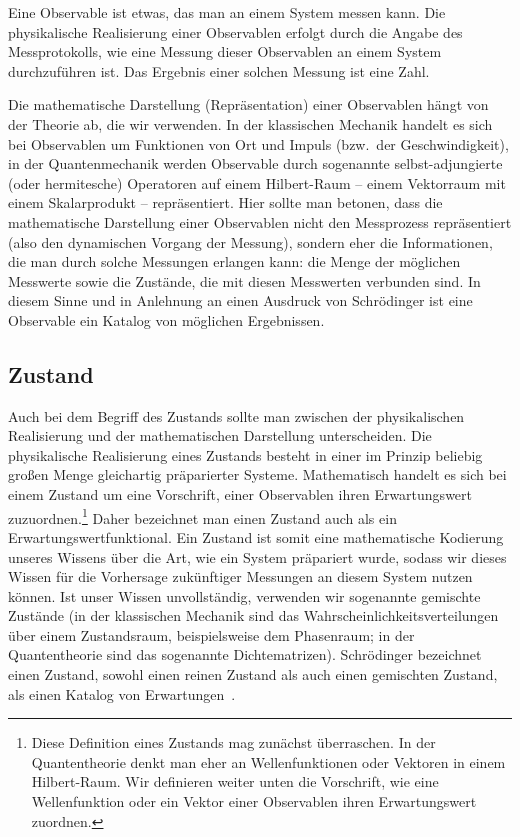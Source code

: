 Eine Observable ist etwas, das man an einem System messen kann. 
Die physikalische Realisierung einer Observablen erfolgt durch die Angabe des Messprotokolls, wie
eine Messung dieser Observablen an einem System durchzuf\"uhren ist. Das Ergebnis einer solchen
Messung ist eine Zahl.

Die mathematische Darstellung (Repr\"asentation) einer Observablen h\"angt von der Theorie
ab, die wir verwenden. In der klassischen Mechanik handelt es sich bei Observablen um 
Funktionen von Ort und Impuls (bzw.\ der Geschwindigkeit), in der Quantenmechanik
werden Observable durch sogenannte selbst-adjungierte (oder hermitesche) Operatoren auf einem
Hilbert-Raum -- einem Vektorraum mit einem Skalarprodukt -- repr\"asentiert. Hier sollte man betonen,
dass die mathematische Darstellung einer Observablen nicht den Messprozess repr\"asentiert (also
den dynamischen Vorgang der Messung), sondern eher die Informationen, die man durch solche
Messungen erlangen kann: die Menge der m\"oglichen Messwerte sowie die Zust\"ande, die mit
diesen Messwerten verbunden sind. In diesem Sinne und in Anlehnung an einen Ausdruck von
Schr\"odinger \cite{Schroedinger} ist eine Observable ein \glqq Katalog von
m\"oglichen Ergebnissen\grqq. 

\subsection{Zustand}

Auch bei dem Begriff des Zustands sollte man zwischen der physikalischen Realisierung 
und der
mathematischen Darstellung unterscheiden. Die physikalische Realisierung eines Zustands
besteht in einer im Prinzip beliebig gro\ss en Menge gleichartig pr\"aparierter Systeme.
Mathematisch handelt es sich bei einem Zustand um eine Vorschrift, einer Observablen
ihren Erwartungswert zuzuordnen.\footnote{Diese Definition eines Zustands mag zun\"achst
\"uberraschen. In der Quantentheorie denkt man eher an Wellenfunktionen oder Vektoren in
einem Hilbert-Raum. Wir definieren weiter unten die Vorschrift, wie eine Wellenfunktion oder
ein Vektor einer Observablen ihren Erwartungswert zuordnen.}  
Daher bezeichnet man einen Zustand auch als ein Erwartungswertfunktional. 
Ein Zustand ist somit eine mathematische Kodierung unseres Wissens \"uber die Art, wie ein
System pr\"apariert wurde, sodass wir dieses Wissen f\"ur die Vorhersage zuk\"unftiger
Messungen an diesem System nutzen k\"onnen. 
Ist unser Wissen unvollst\"andig, verwenden
wir sogenannte gemischte Zust\"ande (in der klassischen Mechanik sind das Wahrscheinlichkeitsverteilungen
\"uber einem Zustandsraum, beispielsweise dem Phasenraum; in der Quantentheorie sind das
sogenannte Dichtematrizen). 
Schr\"odinger bezeichnet einen Zustand, sowohl einen reinen Zustand als auch einen gemischten Zustand, 
als einen \glqq Katalog von Erwartungen\grqq\ \cite{Schroedinger}. 

